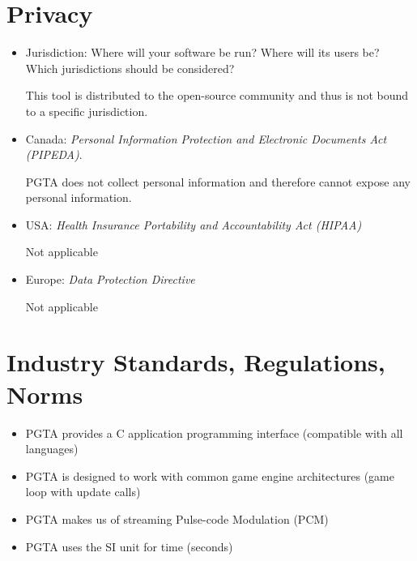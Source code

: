 \documentclass{tufte-handout}
\begin{document}
\newpage
\section{Privacy} 

\begin{itemize}

\item Jurisdiction: Where will your software be run? Where will its
users be? Which jurisdictions should be considered?

This tool is distributed to the open-source community and thus is not bound to a specific jurisdiction. 


\item Canada: \emph{Personal
Information Protection and Electronic Documents Act (PIPEDA)}.

PGTA does not collect personal information and therefore cannot expose any personal information. 


\item USA: \emph{Health Insurance Portability and Accountability Act
(HIPAA)} 

Not applicable

\item Europe: \emph{Data Protection Directive}

Not applicable

\end{itemize}


\newpage
\section{Industry Standards, Regulations, Norms}
\begin{itemize}
    \item PGTA provides a C application programming interface (compatible with all languages)
    \item PGTA is designed to work with common game engine architectures (game loop with update calls)
    \item PGTA makes us of streaming Pulse-code Modulation (PCM) 
    \item PGTA uses the SI unit for time (seconds)
\end{itemize}
\end{document}
